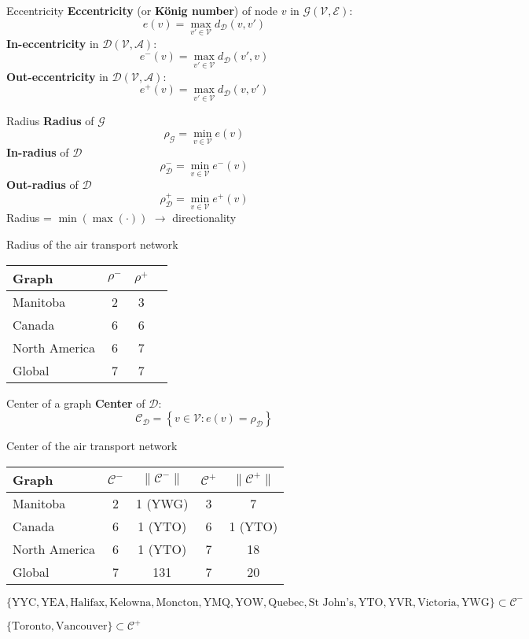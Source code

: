 \documentclass[aspectratio=169]{beamer}\usepackage[]{graphicx}\usepackage[]{xcolor}
\begin{document}
\begin{frame}{Eccentricity}
  \textbf{Eccentricity} (or \textbf{König number}) of node $v$ in $\mathcal{G}(\mathcal{V},\mathcal{E})$:
  $$
  e(v)=\max_{v'\in\mathcal{V}}d_\mathcal{D}(v,v')
  $$
  \textbf{In-eccentricity} in $\mathcal{D}(\mathcal{V},\mathcal{A})$:
  $$
  e^-(v)=\max_{v'\in\mathcal{V}}d_\mathcal{D}(v',v)
  $$
  \textbf{Out-eccentricity} in $\mathcal{D}(\mathcal{V},\mathcal{A})$:
  $$
  e^+(v)=\max_{v'\in\mathcal{V}}d_\mathcal{D}(v,v')
  $$
\end{frame}

\begin{frame}{Radius}
  \textbf{Radius} of $\mathcal{G}$
  $$
  \rho_\mathcal{G}=\min_{v\in\mathcal{V}}e(v)
  $$
  \textbf{In-radius} of $\mathcal{D}$
  $$
  \rho_\mathcal{D}^- = \min_{v\in\mathcal{V}}e^-(v)
  $$
  \textbf{Out-radius} of $\mathcal{D}$
  $$
  \rho_\mathcal{D}^+ = \min_{v\in\mathcal{V}}e^+(v)
  $$
  Radius = $\min(\max(\cdot))$ $\rightarrow$ directionality
\end{frame}

\begin{frame}{Radius of the air transport network}
  \begin{tabular}{lccc}
    Graph & $\rho^-$ & $\rho^+$ \\
    \hline
    Manitoba & 2 & 3 \\
    Canada & 6 & 6 \\
    North America & 6 & 7 \\
    Global & 7 & 7 \\
  \end{tabular}
\end{frame}

\begin{frame}{Center of a graph}
  \textbf{Center} of $\mathcal{D}$:
  $$
  \mathcal{C}_\mathcal{D}=\left\{v\in\mathcal{V}:e(v)=\rho_\mathcal{D}\right\}
  $$
\end{frame}

\begin{frame}{Center of the air transport network}
  \begin{tabular}{lcccc}
    Graph & $\mathcal{C}^-$ & $\|\mathcal{C}^-\|$ & $\mathcal{C}^+$ & $\|\mathcal{C}^+\|$ \\
    \hline
    Manitoba & 2 & 1 (YWG) & 3 & 7 \\
    Canada & 6 & 1 (YTO) & 6 & 1 (YTO) \\
    North America & 6 & 1 (YTO) & 7 & 18 \\
    Global & 7 & 131 & 7 & 20 \\
  \end{tabular}
  
  $\{\text{YYC},\text{YEA},\text{Halifax},\text{Kelowna},\text{Moncton},\text{YMQ},\text{YOW},\text{Quebec},\text{St John's},\text{YTO},\text{YVR}, \text{Victoria},\text{YWG}\}\subset\mathcal{C}^-$
  
  $\{\text{Toronto},\text{Vancouver}\}\subset\mathcal{C}^+$
\end{frame}
\end{document}

